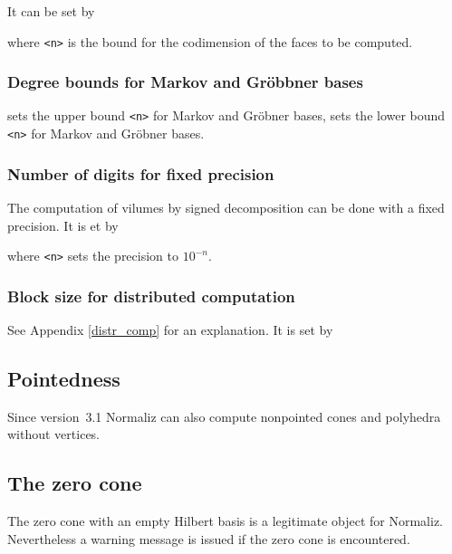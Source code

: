 It can be set by
\begin{itemize}
\end{itemize}
where \verb|<n>| is the bound for the codimension of the faces to be computed.

\subsubsection{Degree bounds for Markov and Gröbbner bases}

\begin{itemize}
	 sets the upper bound \verb|<n>| for Markov and Gröbner bases,
	 sets the lower bound  \verb|<n>| for Markov and Gröbner bases.
\end{itemize}

\subsubsection{Number of digits for fixed precision}
The computation of vilumes by signed decomposition can be done with a fixed precision. It is et by
\begin{itemize}
\end{itemize} 
where \verb|<n>| sets the precision to $10^{-n}$.

\subsubsection{Block size for distributed computation}
See Appendix \ref{distr_comp} for an explanation. It is set by
\begin{itemize}
\end{itemize}

\subsection{Pointedness}

Since version~3.1 Normaliz can also compute nonpointed cones and polyhedra without vertices.

\subsection{The zero cone}\label{zero}
The zero cone with an empty Hilbert basis is a legitimate
object for Normaliz. Nevertheless a warning message is issued
if the zero cone is encountered.
